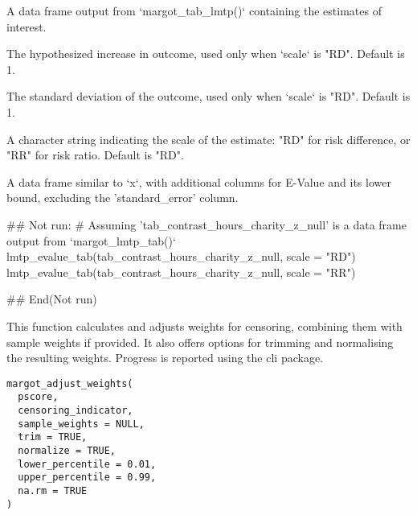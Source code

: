 \documentclass[a4paper]{book}
\begin{document}
%
\begin{Arguments}
\begin{ldescription}
\item[\code{x}] A data frame output from `margot\_tab\_lmtp()` containing the estimates of interest.

\item[\code{delta}] The hypothesized increase in outcome, used only when `scale` is "RD". Default is 1.

\item[\code{sd}] The standard deviation of the outcome, used only when `scale` is "RD". Default is 1.

\item[\code{scale}] A character string indicating the scale of the estimate: "RD" for risk difference,
or "RR" for risk ratio. Default is "RD".
\end{ldescription}
\end{Arguments}
%
\begin{Value}
A data frame similar to `x`, with additional columns for E-Value and its lower bound, excluding
the 'standard\_error' column.
\end{Value}
%
\begin{Examples}
\begin{ExampleCode}
## Not run: 
# Assuming 'tab_contrast_hours_charity_z_null' is a data frame output from `margot_lmtp_tab()`
lmtp_evalue_tab(tab_contrast_hours_charity_z_null, scale = "RD")
lmtp_evalue_tab(tab_contrast_hours_charity_z_null, scale = "RR")

## End(Not run)
\end{ExampleCode}
\end{Examples}
%
\begin{Description}
This function calculates and adjusts weights for censoring, combining them with
sample weights if provided. It also offers options for trimming and normalising
the resulting weights. Progress is reported using the cli package.
\end{Description}
%
\begin{Usage}
\begin{verbatim}
margot_adjust_weights(
  pscore,
  censoring_indicator,
  sample_weights = NULL,
  trim = TRUE,
  normalize = TRUE,
  lower_percentile = 0.01,
  upper_percentile = 0.99,
  na.rm = TRUE
)
\end{verbatim}
\end{Usage}
\end{document}

